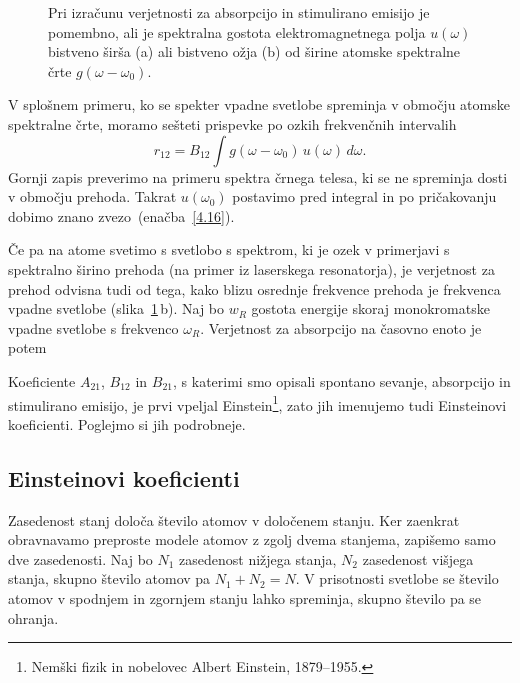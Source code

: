 \begin{figure}[h]
\centering
\def\svgwidth{140truemm} 

\caption{Pri izračunu verjetnosti za absorpcijo in stimulirano emisijo je 
pomembno, ali je spektralna gostota elektromagnetnega polja $u(\omega)$ bistveno širša
(a) ali bistveno ožja (b) od širine atomske spektralne črte $g(\omega-\omega_0)$.}
\label{fig:spektri}
\end{figure}

V splošnem primeru, ko se spekter vpadne svetlobe spreminja v območju 
atomske spektralne črte, moramo sešteti prispevke po ozkih frekvenčnih intervalih
\begin{equation}
r_{12}=B_{12}\int g(\omega-\omega_0)\, u(\omega)\, d\omega.
\label{4.19}
\end{equation}
Gornji zapis preverimo na primeru spektra črnega telesa, ki se ne spreminja 
dosti v območju prehoda. Takrat $u(\omega_0)$ postavimo pred integral in po pričakovanju
dobimo znano zvezo~(enačba~\ref{4.16}). 

Če pa na atome svetimo s svetlobo s spektrom, ki je ozek v primerjavi s spektralno 
širino prehoda (na primer iz laserskega resonatorja), je verjetnost za prehod 
odvisna tudi od tega, kako blizu osrednje frekvence prehoda je frekvenca vpadne 
svetlobe (slika~\ref{fig:spektri}\,b). Naj bo  $w_{R}$ gostota energije skoraj
monokromatske vpadne svetlobe s frekvenco $\omega_R$. Verjetnost za absorpcijo na časovno 
enoto je potem  

Koeficiente $A_{21}$, $B_{12}$ in $B_{21}$, s katerimi smo opisali spontano sevanje,
absorpcijo in stimulirano emisijo, je prvi vpeljal Einstein\footnote{Nemški fizik
in nobelovec Albert Einstein, 1879--1955.}, zato jih imenujemo 
tudi Einsteinovi koeficienti. Poglejmo si jih podrobneje.

\subsection*{Einsteinovi koeficienti}
\label{AB}
Zasedenost stanj določa število atomov v določenem stanju. 
Ker zaenkrat obravnavamo preproste modele atomov z zgolj 
dvema stanjema, zapišemo samo dve zasedenosti. Naj bo $N_1$ zasedenost 
nižjega stanja, $N_{2}$ zasedenost višjega stanja, skupno število atomov pa
$N_1+N_2=N$. V prisotnosti svetlobe se število atomov v spodnjem in zgornjem 
stanju lahko spreminja, skupno število pa se ohranja.

